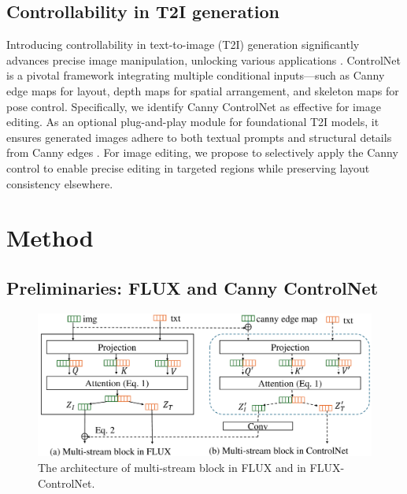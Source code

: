 \documentclass{article}
\begin{document}
\vspace{-1mm}

\subsection{Controllability in T2I generation}
\vspace{-1mm}

Introducing controllability in text-to-image (T2I) generation significantly advances precise image manipulation, unlocking various applications \citep{tan2024ominicontrol,zhang2023adding,li2024controlnet++,li2024unimo,zhao2023uni}. ControlNet \citep{zhang2023adding} is a pivotal framework integrating multiple conditional inputs—such as Canny edge maps for layout, depth maps for spatial arrangement, and skeleton maps for pose control. Specifically, we identify Canny ControlNet as effective for image editing. As an optional plug-and-play module for foundational T2I models, it ensures generated images adhere to both textual prompts and structural details from Canny edges \citep{canny1986computational}. For image editing, we propose to selectively apply the Canny control to enable precise editing in targeted regions while preserving layout consistency elsewhere.


\vspace{-1mm}
\section{Method}

\vspace{-1mm}
\subsection{Preliminaries: FLUX and Canny ControlNet}

\vspace{-1mm}
\begin{figure}
  \vspace{-12pt} %
    \includegraphics[width=1\linewidth]{figures/FLUX-double-controlnet.pdf}
    \caption{The architecture of multi-stream block in FLUX and in FLUX-ControlNet.}
    \label{fig:FLUX_controlnet}
      \vspace{-6pt} %
\end{figure}
\end{document}
